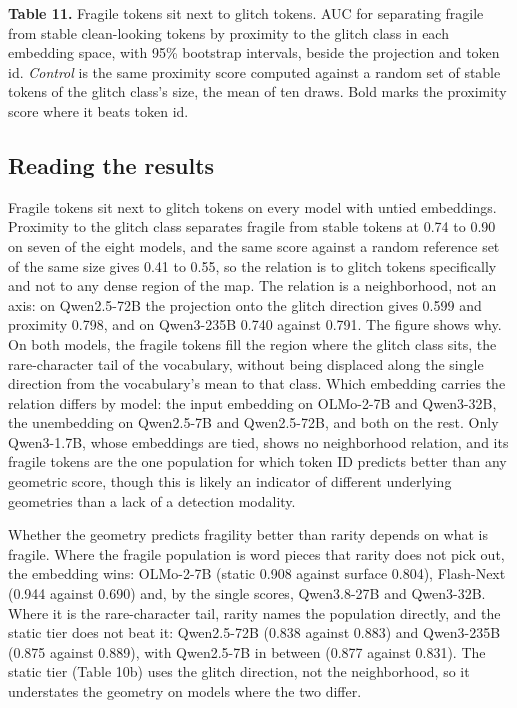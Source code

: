 \documentclass[11pt]{article}
\newenvironment{tabcaption}{\par\vspace{3pt}\small\setlength{\parindent}{0pt}\ignorespaces}{\par\vspace{14pt}}
\begin{document}
\begin{tabcaption}
\textbf{Table 11.} Fragile tokens sit next to glitch tokens. AUC for separating fragile from stable clean-looking tokens by proximity to the glitch class in each embedding space, with 95\% bootstrap intervals, beside the projection and token id. \emph{Control} is the same proximity score computed against a random set of stable tokens of the glitch class's size, the mean of ten draws. Bold marks the proximity score where it beats token id.
\end{tabcaption}

\subsection{Reading the results}\label{reading-the-results}

Fragile tokens sit next to glitch tokens on every model with untied embeddings. Proximity to the glitch class separates fragile from stable tokens at 0.74 to 0.90 on seven of the eight models, and the same score against a random reference set of the same size gives 0.41 to 0.55, so the relation is to glitch tokens specifically and not to any dense region of the map. The relation is a neighborhood, not an axis: on Qwen2.5-72B the projection onto the glitch direction gives 0.599 and proximity 0.798, and on Qwen3-235B 0.740 against 0.791. The figure shows why. On both models, the fragile tokens fill the region where the glitch class sits, the rare-character tail of the vocabulary, without being displaced along the single direction from the vocabulary's mean to that class. Which embedding carries the relation differs by model: the input embedding on OLMo-2-7B and Qwen3-32B, the unembedding on Qwen2.5-7B and Qwen2.5-72B, and both on the rest. Only Qwen3-1.7B, whose embeddings are tied, shows no neighborhood relation, and its fragile tokens are the one population for which token ID predicts better than any geometric score, though this is likely an indicator of different underlying geometries than a lack of a detection modality.

Whether the geometry predicts fragility better than rarity depends on what is fragile. Where the fragile population is word pieces that rarity does not pick out, the embedding wins: OLMo-2-7B (static 0.908 against surface 0.804), Flash-Next (0.944 against 0.690) and, by the single scores, Qwen3.8-27B and Qwen3-32B. Where it is the rare-character tail, rarity names the population directly, and the static tier does not beat it: Qwen2.5-72B (0.838 against 0.883) and Qwen3-235B (0.875 against 0.889), with Qwen2.5-7B in between (0.877 against 0.831). The static tier (Table 10b) uses the glitch direction, not the neighborhood, so it understates the geometry on models where the two differ.
\end{document}
